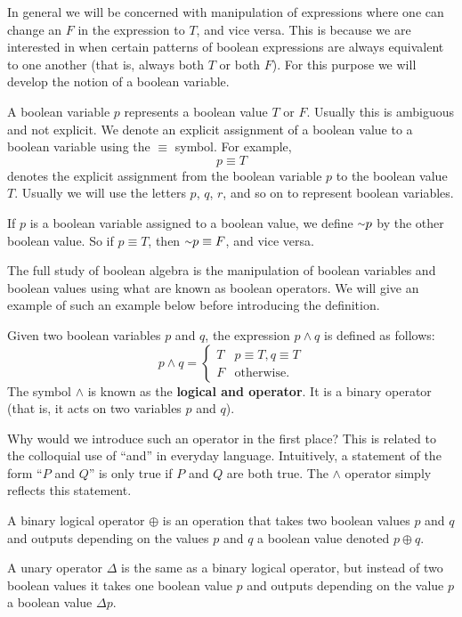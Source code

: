 In general we will be concerned with manipulation of expressions where one can change an $F$ in the expression to $T$, and vice versa. This is because we are interested in when certain patterns of boolean expressions are always equivalent to one another (that is, always both $T$ or both $F$). For this purpose we will develop the notion of a boolean variable.

\begin{definition}
A boolean variable $p$ represents a boolean value $T$ or $F$. Usually this is ambiguous and not explicit. We denote an explicit assignment of a boolean value to a boolean variable using the $\equiv$ symbol. For example,
\[p \equiv T\]
denotes the explicit assignment from the boolean variable $p$ to the boolean value $T$. Usually we will use the letters $p$, $q$, $r$, and so on to represent boolean variables.

If $p$ is a boolean variable assigned to a boolean value, we define $\shortsim p$ by the other boolean value. So if $p \equiv T$, then $\shortsim p \equiv F$, and vice versa.
\end{definition}

The full study of boolean algebra is the manipulation of boolean variables and boolean values using what are known as boolean operators. We will give an example of such an example below before introducing the definition.

\begin{example}
Given two boolean variables $p$ and $q$, the expression $p \land q$ is defined as follows:
\[p \land q = \begin{cases} T & p \equiv T, q \equiv T \\ F & \text{otherwise.}\end{cases}\]
The symbol $\land$ is known as the \textbf{logical and operator}. It is a binary operator (that is, it acts on two variables $p$ and $q$).
\end{example}

Why would we introduce such an operator in the first place? This is related to the colloquial use of ``and'' in everyday language. Intuitively, a statement of the form ``$P$ and $Q$'' is only true if $P$ and $Q$ are both true. The $\land$ operator simply reflects this statement.

\begin{definition}
A binary logical operator $\oplus$ is an operation that takes two boolean values $p$ and $q$ and outputs depending on the values $p$ and $q$ a boolean value denoted $p \oplus q$.

A unary operator $\Delta$ is the same as a binary logical operator, but instead of two boolean values it takes one boolean value $p$ and outputs depending on the value $p$ a boolean value $\Delta p$.
\end{definition}

